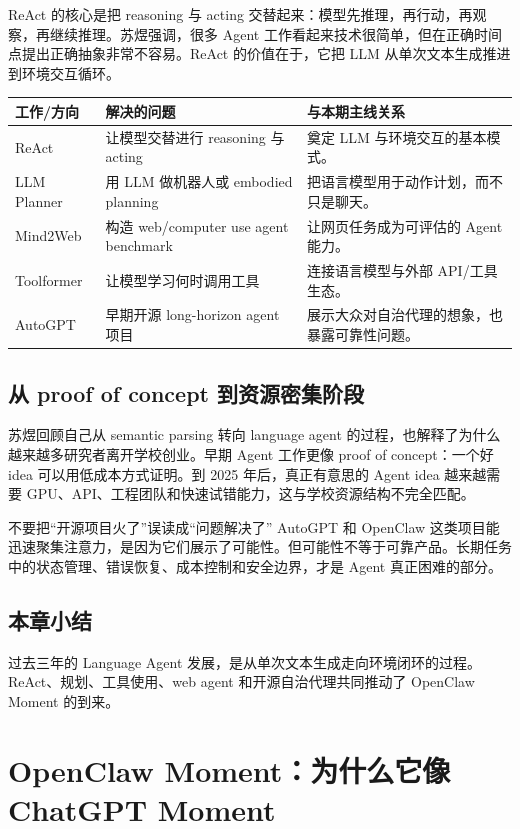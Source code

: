 \documentclass[a4paper]{article}
\begin{document}
ReAct 的核心是把 reasoning 与 acting 交替起来：模型先推理，再行动，再观察，再继续推理。苏煜强调，很多 Agent 工作看起来技术很简单，但在正确时间点提出正确抽象非常不容易。ReAct 的价值在于，它把 LLM 从单次文本生成推进到环境交互循环。

\noindent\begin{tabularx}{\textwidth}{p{}p{}X}
\toprule
工作/方向 & 解决的问题 & 与本期主线关系 \\
\midrule
ReAct & 让模型交替进行 reasoning 与 acting & 奠定 LLM 与环境交互的基本模式。 \\
LLM Planner & 用 LLM 做机器人或 embodied planning & 把语言模型用于动作计划，而不只是聊天。 \\
Mind2Web & 构造 web/computer use agent benchmark & 让网页任务成为可评估的 Agent 能力。 \\
Toolformer & 让模型学习何时调用工具 & 连接语言模型与外部 API/工具生态。 \\
AutoGPT & 早期开源 long-horizon agent 项目 & 展示大众对自治代理的想象，也暴露可靠性问题。 \\
\bottomrule
\end{tabularx}

\subsection{从 proof of concept 到资源密集阶段}

苏煜回顾自己从 semantic parsing 转向 language agent 的过程，也解释了为什么越来越多研究者离开学校创业。早期 Agent 工作更像 proof of concept：一个好 idea 可以用低成本方式证明。到 2025 年后，真正有意思的 Agent idea 越来越需要 GPU、API、工程团队和快速试错能力，这与学校资源结构不完全匹配。

\begin{warningbox}{不要把“开源项目火了”误读成“问题解决了”}
AutoGPT 和 OpenClaw 这类项目能迅速聚集注意力，是因为它们展示了可能性。但可能性不等于可靠产品。长期任务中的状态管理、错误恢复、成本控制和安全边界，才是 Agent 真正困难的部分。
\end{warningbox}

\subsection{本章小结}

过去三年的 Language Agent 发展，是从单次文本生成走向环境闭环的过程。ReAct、规划、工具使用、web agent 和开源自治代理共同推动了 OpenClaw Moment 的到来。

\section{OpenClaw Moment：为什么它像 ChatGPT Moment}
\end{document}
